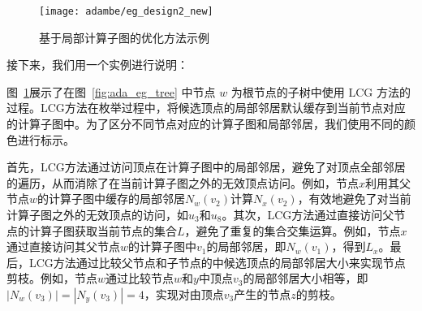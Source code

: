 \begin{figure} [H]
	\centering
  \vspace{0.1in}
	\texttt{[image: adambe/eg\_design2\_new]}
	\caption{基于局部计算子图的优化方法示例}

	\label{fig:ada_design2}
\end{figure}

接下来，我们用一个实例进行说明：

\begin{example}
	图~\ref{fig:ada_design2}展示了在图~\ref{fig:ada_eg_tree} 中节点 $w$ 为根节点的子树中使用 LCG 方法的过程。LCG方法在枚举过程中，将候选顶点的局部邻居默认缓存到当前节点对应的计算子图中。为了区分不同节点对应的计算子图和局部邻居，我们使用不同的颜色进行标示。

	首先，LCG方法通过访问顶点在计算子图中的局部邻居，避免了对顶点全部邻居的遍历，从而消除了在当前计算子图之外的无效顶点访问。例如，节点$x$利用其父节点$w$的计算子图中缓存的局部邻居$N_w(v_2)$计算$N_x(v_2)$，有效地避免了对当前计算子图之外的无效顶点的访问，如$u_3$和$u_8$。其次，LCG方法通过直接访问父节点的计算子图获取当前节点的集合$L$，避免了重复的集合交集运算。例如，节点$x$通过直接访问其父节点$w$的计算子图中$v_1$的局部邻居，即$N_w(v_1)$，得到$L_x$。最后，LCG方法通过比较父节点和子节点的中候选顶点的局部邻居大小来实现节点剪枝。例如，节点$w$通过比较节点$w$和$y$中顶点$v_3$的局部邻居大小相等，即$|N_w(v_3)| = |N_y(v_3)| = 4$，实现对由顶点$v_3$产生的节点$z$的剪枝。
	



		








\end{example}

